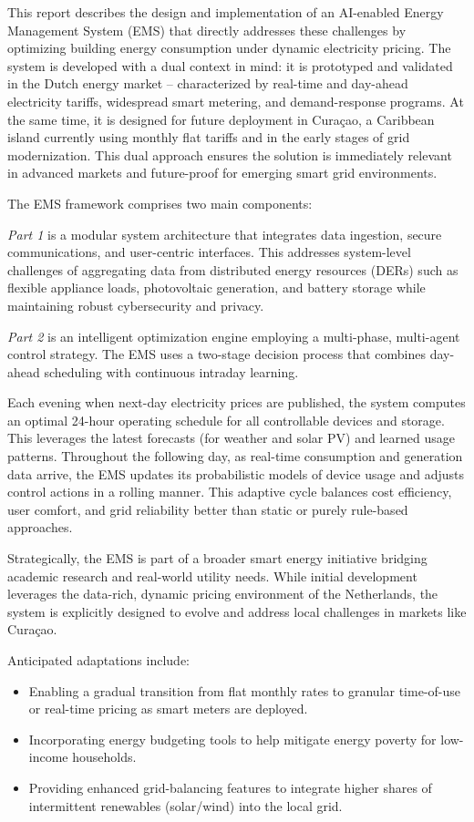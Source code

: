 \documentclass[12pt,a4paper]{article}
\begin{document}
This report describes the design and implementation of an AI-enabled Energy Management System (EMS) that directly addresses these challenges by optimizing building energy consumption under dynamic electricity pricing. The system is developed with a dual context in mind: it is prototyped and validated in the Dutch energy market – characterized by real-time and day-ahead electricity tariffs, widespread smart metering, and demand-response programs. At the same time, it is designed for future deployment in Curaçao, a Caribbean island currently using monthly flat tariffs and in the early stages of grid modernization. This dual approach ensures the solution is immediately relevant in advanced markets and future-proof for emerging smart grid environments.

The EMS framework comprises two main components:

\textit{Part 1} is a modular system architecture that integrates data ingestion, secure communications, and user-centric interfaces. This addresses system-level challenges of aggregating data from distributed energy resources (DERs) such as flexible appliance loads, photovoltaic generation, and battery storage while maintaining robust cybersecurity and privacy. 

\textit{Part 2} is an intelligent optimization engine employing a multi-phase, multi-agent control strategy. The EMS uses a two-stage decision process that combines day-ahead scheduling with continuous intraday learning. 

Each evening when next-day electricity prices are published, the system computes an optimal 24-hour operating schedule for all controllable devices and storage. This leverages the latest forecasts (for weather and solar PV) and learned usage patterns. Throughout the following day, as real-time consumption and generation data arrive, the EMS updates its probabilistic models of device usage and adjusts control actions in a rolling manner. This adaptive cycle balances cost efficiency, user comfort, and grid reliability better than static or purely rule-based approaches.

Strategically, the EMS is part of a broader smart energy initiative bridging academic research and real-world utility needs. While initial development leverages the data-rich, dynamic pricing environment of the Netherlands, the system is explicitly designed to evolve and address local challenges in markets like Curaçao. 

Anticipated adaptations include: 
\begin{itemize}
    \item Enabling a gradual transition from flat monthly rates to granular time-of-use or real-time pricing as smart meters are deployed.
    \item Incorporating energy budgeting tools to help mitigate energy poverty for low-income households.
    \item Providing enhanced grid-balancing features to integrate higher shares of intermittent renewables (solar/wind) into the local grid.
\end{itemize} 
\end{document}
